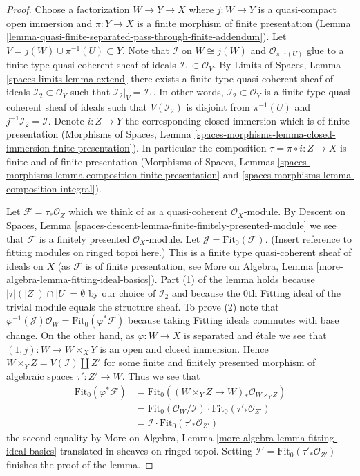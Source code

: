 \documentclass[10pt,a4paper]{amsart}
\theoremstyle{plain}
\theoremstyle{definition}
\theoremstyle{remark}
\numberwithin{equation}{subsection}
\begin{document}
\begin{proof}
Choose a factorization $W \to Y \to X$ where $j : W \to Y$ is a
quasi-compact open immersion and $\pi : Y \to X$ is a finite
morphism of finite presentation
(Lemma \ref{lemma-quasi-finite-separated-pass-through-finite-addendum}).
Let $V = j(W) \cup \pi^{-1}(U) \subset Y$. Note that
$\mathcal{I}$ on $W \cong j(W)$ and $\mathcal{O}_{\pi^{-1}(U)}$
glue to a finite type quasi-coherent sheaf of ideals
$\mathcal{I}_1 \subset \mathcal{O}_V$. By
Limits of Spaces, Lemma \ref{spaces-limits-lemma-extend}
there exists a finite type quasi-coherent sheaf of ideals
$\mathcal{I}_2 \subset \mathcal{O}_Y$ such that
$\mathcal{I}_2|_V = \mathcal{I}_1$. In other words,
$\mathcal{I}_2 \subset \mathcal{O}_Y$
is a finite type quasi-coherent sheaf of ideals such that
$V(\mathcal{I}_2)$ is disjoint from $\pi^{-1}(U)$ and
$j^{-1}\mathcal{I}_2 = \mathcal{I}$. Denote $i : Z \to Y$
the corresponding closed immersion which is of finite presentation
(Morphisms of Spaces, Lemma
\ref{spaces-morphisms-lemma-closed-immersion-finite-presentation}).
In particular the composition $\tau = \pi \circ i : Z \to X$ is finite
and of finite presentation
(Morphisms of Spaces, Lemmas
\ref{spaces-morphisms-lemma-composition-finite-presentation} and
\ref{spaces-morphisms-lemma-composition-integral}).

\medskip\noindent
Let $\mathcal{F} = \tau_*\mathcal{O}_Z$ which we think of as
a quasi-coherent $\mathcal{O}_X$-module. By
Descent on Spaces, Lemma
\ref{spaces-descent-lemma-finite-finitely-presented-module}
we see that $\mathcal{F}$ is a finitely presented $\mathcal{O}_X$-module.
Let $\mathcal{J} = \text{Fit}_0(\mathcal{F})$. (Insert reference to
fitting modules on ringed topoi here.) This is a finite type quasi-coherent
sheaf of ideals on $X$ (as $\mathcal{F}$ is of finite presentation, see
More on Algebra, Lemma \ref{more-algebra-lemma-fitting-ideal-basics}).
Part (1) of the lemma holds because $|\tau|(|Z|) \cap |U| = \emptyset$
by our choice of $\mathcal{I}_2$ and because the $0$th Fitting ideal
of the trivial module equals the structure sheaf. To prove (2) note that
$\varphi^{-1}(\mathcal{J})\mathcal{O}_W = \text{Fit}_0(\varphi^*\mathcal{F})$
because taking Fitting ideals commutes with base change.
On the other hand, as $\varphi : W \to X$ is separated and \'etale
we see that $(1, j) : W \to W \times_X Y$ is an open and closed immersion.
Hence $W \times_Y Z = V(\mathcal{I}) \amalg Z'$ for some finite and
finitely presented morphism of algebraic spaces $\tau' : Z' \to W$.
Thus we see that
\begin{align*}
\text{Fit}_0(\varphi^*\mathcal{F}) & =
\text{Fit}_0((W \times_Y Z \to W)_*\mathcal{O}_{W \times_Y Z}) \\
& =
\text{Fit}_0(\mathcal{O}_W/\mathcal{I}) \cdot
\text{Fit}_0(\tau'_*\mathcal{O}_{Z'}) \\
& =
\mathcal{I} \cdot \text{Fit}_0(\tau'_*\mathcal{O}_{Z'})
\end{align*}
the second equality by
More on Algebra, Lemma \ref{more-algebra-lemma-fitting-ideal-basics}
translated in sheaves on ringed topoi.
Setting $\mathcal{I}' = \text{Fit}_0(\tau'_*\mathcal{O}_{Z'})$
finishes the proof of the lemma.
\end{proof}
\end{document}

